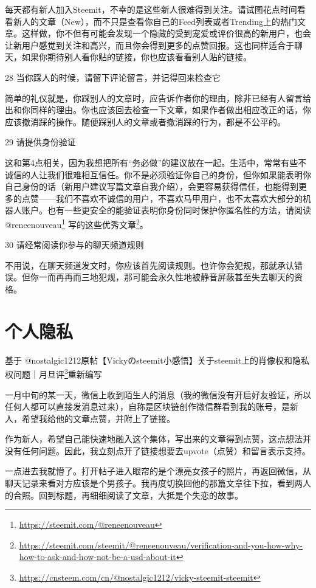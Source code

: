 \documentclass[]{ctexbook}
\renewcommand{\href}[2]{#2\footnote{\url{#1}}}
\begin{document}
每天都有新人加入Steemit，不幸的是这些新人很难得到关注。请试图花点时间看看新人的文章（New），而不只是查看你自己的Feed列表或者Trending上的热门文章。这样做，你不但有可能会发现一个隐藏的受到宠爱或评价很高的新用户，也会让新用户感觉到关注和高兴，而且你会得到更多的点赞回报。这也同样适合于聊天，如果你期待别人看你贴的链接，你也应该看看别人贴的链接。

28 当你踩人的时候，请留下评论留言，并记得回来检查它

简单的礼仪就是，你踩别人的文章时，应告诉作者你的理由，除非已经有人留言给出和你同样的理由。你也应该回去检查一下文章，如果作者做出相应改正的话，你应该撤消踩的操作。随便踩别人的文章或者撤消踩的行为，都是不公平的。

29 请提供身份验证

这和第4点相关，因为我想把所有``务必做''的建议放在一起。生活中，常常有些不诚信的人让我们很难相互信任。你不是必须验证你自己的身份，但你如果能表明你自己身份的话（新用户建议写篇文章自我介绍），会更容易获得信任，也能得到更多的点赞------我们不喜欢不诚信的用户，不喜欢马甲用户，也不太喜欢大部分的机器人账户。也有一些更安全的能验证表明你身份同时保护你匿名性的方法，请阅读 \href{https://steemit.com/@reneenouveau}{@reneenouveau} 写的\href{https://steemit.com/steemit/@reneenouveau/verification-and-you-how-why-how-to-ask-and-how-not-be-a-usd-about-it}{这些优秀文章}。

30 请经常阅读你参与的聊天频道规则

不用说，在聊天频道发文时，你应该首先阅读规则。也许你会犯规，那就承认错误。但你一而再再而三地犯规，那可能会永久性地被静音屏蔽甚至失去聊天的资格。

\hypertarget{grys}{%
\section{个人隐私}\label{grys}}

基于 @nostalgic1212原帖\href{https://cnsteem.com/cn/@nostalgic1212/vicky-steemit-steemit}{【Vickyのsteemit小感悟】关于steemit上的肖像权和隐私权问题｜月旦评}重新编写

一月中旬的某一天，微信上收到陌生人的消息（我的微信没有开启好友验证，所以任何人都可以直接发消息过来），自称是区块链创作微信群看到我的账号，是新人，希望我给他的文章点赞，并附上了链接。

作为新人，希望自己能快速地融入这个集体，写出来的文章得到点赞，这点想法并没有任何问题。因此，我立刻点开了链接想要去upvote（点赞）和留言表示支持。

一点进去我就懵了。打开帖子进入眼帘的是个漂亮女孩子的照片，再返回微信，从聊天记录来看对方应该是个男孩子。我再度切换回他的那篇文章往下拉，看到两人的合照。回到标题，再细细阅读了文章，大抵是个失恋的故事。
\end{document}
